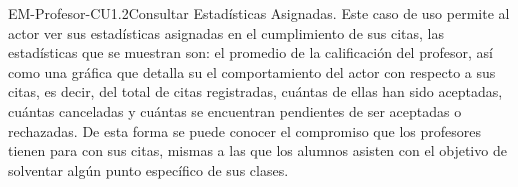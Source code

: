 \begin{UseCase}{EM-Profesor-CU1.2}{Consultar Estadísticas Asignadas.}{
	\noindent
	Este caso de uso permite al actor ver sus estadísticas asignadas en el cumplimiento de sus citas, las estadísticas que se muestran son: el promedio de la calificación del profesor, así como una gráfica que detalla su el comportamiento del actor con respecto a sus citas, es decir, del total de citas registradas, cuántas de ellas han sido aceptadas, cuántas canceladas y cuántas se encuentran pendientes de ser aceptadas o rechazadas. De esta forma se puede conocer el compromiso que los profesores tienen para con sus citas, mismas a las que los alumnos asisten con el objetivo de solventar algún punto específico de sus clases. 
	\newline
	}
\end{UseCase}

